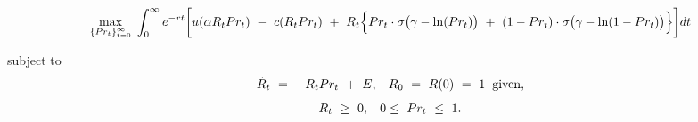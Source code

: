\begin{small}
\begin{equation}
\begin{split}
     \underset{\{Pr_{t}\}_{t = 0}^{\infty}}{\max} \hspace{0.1cm} \int_{0}^{\infty} e^{-rt} \bigg[ u(\alpha R_{t} Pr_{t}) \ - \ c(R_{t} Pr_{t}) \ + \ R_{t} \Big\{ Pr_{t} \cdot \sigma \big( \gamma - \ln(Pr_{t}) \big) \ + \ (1 - Pr_{t}) \cdot \sigma \big( \gamma - \ln(1 - Pr_{t}) \big) \Big\} \bigg] dt
\end{split}
\label{Equation:Social-Planners-Problem_Formulation}
\end{equation}
\end{small}
subject to
\begin{equation}
\begin{split}
    \dot{R}_{t} \ = \ -R_{t}Pr_{t} \ + \ E, \hspace{0.3cm} R_{0} \ = \ R(0) \ = \ 1 \hspace{0.2cm} \text{given,}
\end{split}
\label{Equation:Social-Planners-Problem_Law-of-Motion}
\end{equation}
\begin{equation}
\begin{split}
    R_{t} \ \geq \ 0, \hspace{0.3cm} 0 \leq \ Pr_{t} \ \leq \ 1.
\end{split}
\end{equation}
